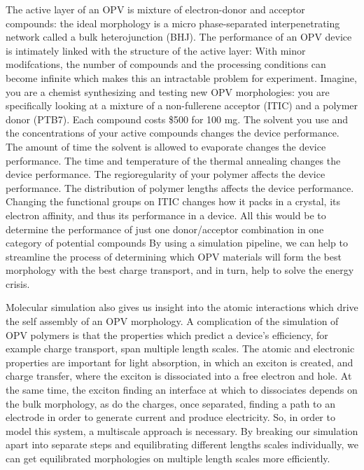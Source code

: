 The active layer of an OPV is mixture of electron-donor and acceptor compounds: the ideal morphology is a micro phase-separated interpenetrating network called a bulk heterojunction (BHJ).
The performance of an OPV device is intimately linked with the structure of the active layer:
With minor modifcations, the number of compounds and the processing conditions can become infinite which makes this an intractable problem for experiment.
Imagine, you are a chemist synthesizing and testing new OPV morphologies: you are specifically looking at a mixture of a non-fullerene acceptor (ITIC) and a polymer donor (PTB7). 
Each compound costs \$500 for 100 mg. \cite{sigmaaldrich.com}
The solvent you use and the concentrations of your active compounds changes the device performance.\cite{Hoppe2004a}
The amount of time the solvent is allowed to evaporate changes the device performance\cite{Li2007}.
The time and temperature of the thermal annealing changes the device performance\cite{Ma2005}.
The regioregularity of your polymer affects the device performance. \cite{Kim2006}
The distribution of polymer lengths affects the device performance. \cite{Zhao2013b}
Changing the functional groups on ITIC changes how it packs in a crystal, its electron affinity, and thus its performance in a device\cite{Swick2019a}.
All this would be to determine the performance of just one donor/acceptor combination in one category of potential compounds\cite{Dou2013}
By using a simulation pipeline, we can help to streamline the process of determining which OPV materials will form the best morphology with the best charge transport, and in turn, help to solve the energy crisis.

Molecular simulation also gives us insight into the atomic interactions which drive the self assembly of an OPV morphology.
A complication of the simulation of OPV polymers is that the properties which predict a device's efficiency, for example charge transport, span multiple length scales.
The atomic and electronic properties are important for light absorption, in which an exciton is created, and charge transfer, where the exciton is dissociated into a free electron and hole\cite{Scharber2006,Hoppe2004,Mazzio2015}.
At the same time, the exciton finding an interface at which to dissociates depends on the bulk morphology, as do the charges, once separated, finding a path to an electrode in order to generate current and produce electricity.
So, in order to model this system, a multiscale approach is necessary.
By breaking our simulation apart into separate steps and equilibrating different lengths scales individually, we can get equilibrated morphologies on multiple length scales more efficiently.

